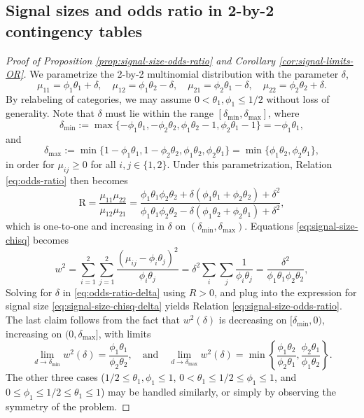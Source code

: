 
\subsection{Signal sizes and odds ratio in 2-by-2 contingency tables}

\begin{proof}[Proof of Proposition \ref{prop:signal-size-odds-ratio} and Corollary \ref{cor:signal-limits-OR}]
We parametrize the 2-by-2 multinomial distribution with the parameter $\delta$, 
$$
\mu_{11} = \phi_1\theta_1+\delta,\quad \mu_{12} = \phi_1\theta_2-\delta,\quad 
\mu_{21} = \phi_2\theta_1-\delta,\quad \mu_{22} = \phi_2\theta_2+\delta.
$$ 
By relabeling of categories, we may assume $0<\theta_1,\phi_1\le1/2$ without loss of generality.
Note that $\delta$ must lie within the range $[\delta_\mathrm{min}, \delta_\mathrm{max}]$, where
$$
\delta_\mathrm{min} := \max\{-\phi_1\theta_1, -\phi_2\theta_2, \phi_1\theta_2-1, \phi_2\theta_1-1\} 
= -\phi_1\theta_1,
$$
and
$$
\delta_\mathrm{max} := \min\{1-\phi_1\theta_1, 1-\phi_2\theta_2, \phi_1\theta_2, \phi_2\theta_1\}
= \min\{\phi_1\theta_2, \phi_2\theta_1\},
$$
in order for $\mu_{ij}\ge0$ for all $i,j\in \{1,2\}$.
Under this parametrization, Relation \eqref{eq:odds-ratio} then becomes
\begin{equation} \label{eq:odds-ratio-delta}
    \text{R} = \frac{\mu_{11}\mu_{22}}{\mu_{12}\mu_{21}}
    = \frac{\phi_1\theta_1\phi_2\theta_2 + \delta(\phi_1\theta_1+\phi_2\theta_2)+\delta^2}{\phi_1\theta_1\phi_2\theta_2 - \delta(\phi_1\theta_2+\phi_2\theta_1)+\delta^2},
\end{equation}
which is one-to-one and increasing in $\delta$ on $(\delta_\mathrm{min}, \delta_\mathrm{max})$.
Equations \eqref{eq:signal-size-chisq} becomes
\begin{equation} \label{eq:signal-size-chisq-delta}
w^2 = \sum_{i=1}^2 \sum_{j=1}^2 \frac{(\mu_{ij} - \phi_i\theta_j)^2}{\phi_i\theta_j}
= \delta^2\sum_i\sum_j \frac{1}{\phi_i\theta_j}
= \frac{\delta^2}{\phi_1\theta_1\phi_2\theta_2},
\end{equation}
Solving for $\delta$ in \eqref{eq:odds-ratio-delta} using $R>0$, and plug into the expression for signal size \eqref{eq:signal-size-chisq-delta} yields Relation \eqref{eq:signal-size-odds-ratio}.
The last claim follows from the fact that $w^2(\delta)$ is decreasing on $[\delta_\mathrm{min},0)$, increasing on $(0,\delta_\mathrm{max}]$, with limits
$$
\lim_{d\to \delta_\mathrm{min}} w^2(\delta) = \frac{\phi_1\theta_1}{\phi_2\theta_2},
\quad
\text{and}
\quad
\lim_{d\to \delta_\mathrm{max}} w^2(\delta) = \min\left\{\frac{\phi_1\theta_2}{\phi_2\theta_1}, \frac{\phi_2\theta_1}{\phi_1\theta_2}\right\}.
$$
The other three cases ($1/2\le\theta_1,\phi_1\le1$, $0<\theta_1\le1/2\le\phi_1\le1$, and $0\le\phi_1\le1/2\le\theta_1\le1$) may be handled similarly, or simply by observing the symmetry of the problem.
\end{proof}


